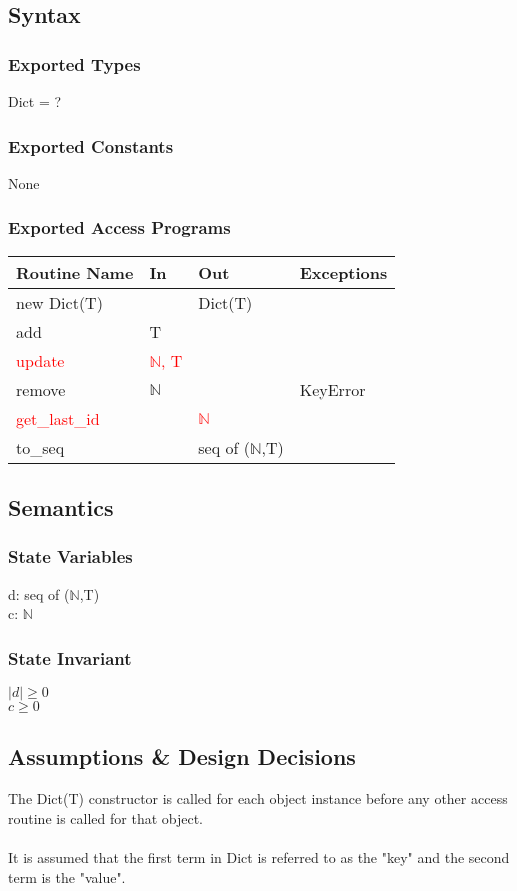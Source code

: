 \documentclass[12pt, titlepage]{article}
\begin{document}
\subsection*{Syntax}
\subsubsection*{Exported Types}
Dict = ?

\subsubsection*{Exported Constants}
None

\subsubsection* {Exported Access Programs}
\begin{tabular}{|p{3cm}|p{3cm}|p{3cm}|p{4.5cm}|}
    \hline
    \textbf{Routine Name} & \textbf{In} & \textbf{Out} & \textbf{Exceptions} \\
    \hline
    new Dict(T) & & Dict(T) &\\
    \hline
    add & T & &\\
    \hline
    \textcolor{red}{update} & \textcolor{red}{$\mathbb{N}$, T} & &\\
    \hline
    remove & $\mathbb{N}$ & & KeyError\\
    \hline
    \textcolor{red}{get\_last\_id} & & \textcolor{red}{$\mathbb{N}$} &\\
    \hline
    to\_seq & & seq of ($\mathbb{N}$,T) & \\
    \hline
\end{tabular}

\subsection*{Semantics}
\subsubsection*{State Variables}
d: seq of ($\mathbb{N}$,T) \\
c: $\mathbb{N}$

\subsubsection*{State Invariant}
$|d| \geq 0$\\
$c \geq 0$

\subsection*{Assumptions \& Design Decisions}
The Dict(T) constructor is called for each object instance before any other access routine is called for that object.\\ \\
It is assumed that the first term in Dict is referred to as the "key" and the second term is the "value".
\end{document}
